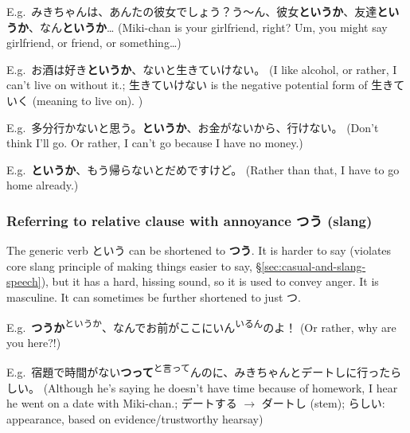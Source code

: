 \documentclass[../nihongo-gakushuu-kyouzai-grammar.tex]{subfiles}
\begin{document}
E.g.\ みきちゃんは、あんたの彼女でしょう？う〜ん、彼女\textbf{というか}、友達\textbf{というか}、なん\textbf{というか}\dots{} (Miki-chan is your girlfriend, right? Um, you might say girlfriend, or friend, or something\dots)

E.g.\ お酒は好き\textbf{というか}、ないと生きていけない。 (I like alcohol, or rather, I can't live on without it.; 生きていけない is the negative potential form of 生きていく (meaning to live on).  )

E.g.\ 多分行かないと思う。\textbf{というか}、お金がないから、行けない。 (Don't think I'll go. Or rather, I can't go because I have no money.)

E.g.\ \textbf{というか}、もう帰らないとだめですけど。 (Rather than that, I have to go home already.)


\subsubsection{Referring to relative clause with annoyance つう (slang)} \label{sec:referring-to-relative-clause-annoyance-slang}
The generic verb という can be shortened to \textbf{つう}. It is harder to say (violates core slang principle of making things easier to say, \S\ref{sec:casual-and-slang-speech}), but it has a hard, hissing sound, so it is used to convey anger. It is masculine. It can sometimes be further shortened to just つ. 

E.g.\ \textbf{つうか}\textsuperscript{というか}、なんでお前がここにいん\textsuperscript{いるん}のよ！ (Or rather, why are you here?!)

E.g.\ 宿題で時間がない\textbf{つって}\textsuperscript{と言って}んのに、みきちゃんとデートしに行ったらしい。 (Although he's saying he doesn't have time because of homework, I hear he went on a date with Miki-chan.; デートする $\to$ ダートし (stem); らしい: appearance, based on evidence/trustworthy hearsay)
\end{document}
